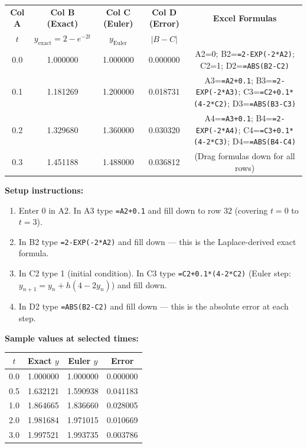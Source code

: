 \documentclass[12pt,a4paper]{article}
\begin{document}
\medskip
\begin{center}
\small
\begin{tabular}{@{} c c c c c @{}}
\toprule
\textbf{Col A} & \textbf{Col B (Exact)} & \textbf{Col C (Euler)} & \textbf{Col D (Error)} & \textbf{Excel Formulas} \\
$t$ & $y_{\text{exact}} = 2-e^{-2t}$ & $y_{\text{Euler}}$ & $|B-C|$ & \\
\midrule
0.0 & 1.000000 & 1.000000 & 0.000000 & A2=0; B2=\texttt{=2-EXP(-2*A2)}; C2=1; D2=\texttt{=ABS(B2-C2)} \\
0.1 & 1.181269 & 1.200000 & 0.018731 & A3=\texttt{=A2+0.1}; B3=\texttt{=2-EXP(-2*A3)}; C3=\texttt{=C2+0.1*(4-2*C2)}; D3=\texttt{=ABS(B3-C3)} \\
0.2 & 1.329680 & 1.360000 & 0.030320 & A4=\texttt{=A3+0.1}; B4=\texttt{=2-EXP(-2*A4)}; C4=\texttt{=C3+0.1*(4-2*C3)}; D4=\texttt{=ABS(B4-C4)} \\
0.3 & 1.451188 & 1.488000 & 0.036812 & (Drag formulas down for all rows) \\
\bottomrule
\end{tabular}
\end{center}

\medskip
\textbf{Setup instructions:}
\begin{enumerate}
  \item Enter 0 in A2. In A3 type \texttt{=A2+0.1} and fill down to row 32 (covering $t=0$ to $t=3$).
  \item In B2 type \texttt{=2-EXP(-2*A2)} and fill down --- this is the Laplace-derived exact formula.
  \item In C2 type 1 (initial condition). In C3 type \texttt{=C2+0.1*(4-2*C2)} (Euler step: $y_{n+1} = y_n + h(4-2y_n)$) and fill down.
  \item In D2 type \texttt{=ABS(B2-C2)} and fill down --- this is the absolute error at each step.
\end{enumerate}

\textbf{Sample values at selected times:}
\begin{center}
\begin{tabular}{@{}cccc@{}}
\toprule
$t$ & Exact $y$ & Euler $y$ & Error \\
\midrule
0.0 & 1.000000 & 1.000000 & 0.000000 \\
0.5 & 1.632121 & 1.590938 & 0.041183 \\
1.0 & 1.864665 & 1.836660 & 0.028005 \\
2.0 & 1.981684 & 1.971015 & 0.010669 \\
3.0 & 1.997521 & 1.993735 & 0.003786 \\
\bottomrule
\end{tabular}
\end{center}
\end{document}
